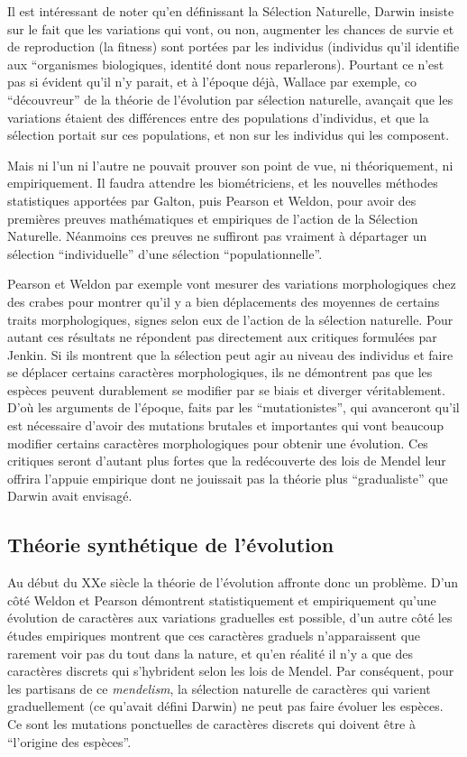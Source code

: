 Il est intéressant de noter qu'en définissant la Sélection Naturelle, Darwin insiste sur le fait que les variations qui vont, ou non, augmenter les chances de survie et de reproduction (la fitness) sont portées par les individus (individus qu'il identifie aux ``organismes biologiques, identité dont nous reparlerons). Pourtant ce n'est pas si évident qu'il n'y parait, et à l'époque déjà, Wallace par exemple, co ``découvreur'' de la théorie de l'évolution par sélection naturelle, avançait que les variations étaient des différences entre des populations d'individus, et que la sélection portait sur ces populations, et non sur les individus qui les composent. 

Mais ni l'un ni l'autre ne pouvait prouver son point de vue, ni théoriquement, ni empiriquement. Il faudra attendre les biométriciens, et les nouvelles méthodes statistiques apportées par Galton, puis Pearson et Weldon, pour avoir des premières preuves mathématiques et empiriques de l'action de la Sélection Naturelle. Néanmoins ces preuves ne suffiront pas vraiment à départager un sélection ``individuelle'' d'une sélection ``populationnelle''.

Pearson et Weldon par exemple vont mesurer des variations morphologiques chez des crabes pour montrer qu'il y a bien déplacements des moyennes de certains traits morphologiques, signes selon eux de l'action de la sélection naturelle. Pour autant ces résultats ne répondent pas directement aux critiques formulées par Jenkin. Si ils montrent que la sélection peut agir au niveau des individus et faire se déplacer certains caractères morphologiques, ils ne démontrent pas que les espèces peuvent durablement se modifier par se biais et diverger véritablement. D'où les arguments de l'époque, faits par les ``mutationistes'', qui avanceront qu'il est nécessaire d'avoir des mutations brutales et importantes qui vont beaucoup modifier certains caractères morphologiques pour obtenir une évolution. Ces critiques seront d'autant plus fortes que la redécouverte des lois de Mendel leur offrira l'appuie empirique dont ne jouissait pas la théorie plus ``gradualiste'' que Darwin avait envisagé.

\subsection{Théorie synthétique de l'évolution}\label{sec:SM}
Au début du XXe siècle la théorie de l'évolution affronte donc un problème. D'un côté Weldon et Pearson démontrent statistiquement et empiriquement qu'une évolution de caractères aux variations graduelles est possible, d'un autre côté les études empiriques montrent que ces caractères graduels n'apparaissent que rarement voir pas du tout dans la nature, et qu'en réalité il n'y a que des caractères discrets qui s'hybrident selon les lois de Mendel. Par conséquent, pour les partisans de ce \emph{mendelism}, la sélection naturelle de caractères qui varient graduellement (ce qu'avait défini Darwin) ne peut pas faire évoluer les espèces. Ce sont les mutations ponctuelles de caractères discrets qui doivent être à ``l'origine des espèces''. 

